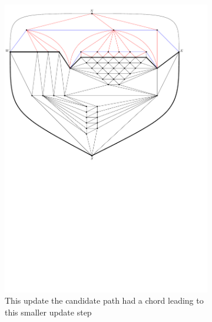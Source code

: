 \begin{figure}
    \ContinuedFloat
    \begin{subfigure}[b]{.9 \textwidth}
      \includegraphics[width=\textwidth]{examples/img/vertWorstCase/sweep3}
      \caption{This update the candidate path had a chord leading to this smaller update step}
      \label{fig:ex:vert:sweep3}
    \end{subfigure}
    ~
    \begin{subfigure}[b]{.9 \textwidth}

\end{subfigure}
\end{figure}
